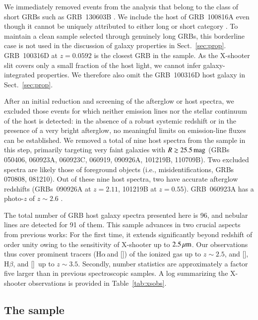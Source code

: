 \documentclass[traditabstract, longauth]{aa}
\newcommand{\hb}{H$\beta$}
\newcommand{\ha}{H$\alpha$}
\newcommand{\oii}{[\ion{O}{ii}]}
\newcommand{\oiii}{[\ion{O}{iii}]}
\newcommand{\nii}{[\ion{N}{ii}]}
\begin{document}
We immediately removed events from the analysis that belong to the class of short GRBs such as GRB~130603B \citep[e.g.,][]{2014A&A...563A..62D}. We include the host of GRB~100816A even though it cannot be uniquely attributed to either long or short category \citep{2010GCNR..300....1O}. To maintain a clean sample selected through genuinely long GRBs, this borderline case is not used in the discussion of galaxy properties in Sect.~\ref{sec:prop}. GRB~100316D at $z=0.0592$ \citep[e.g.,][]{2011MNRAS.411.2792S, 2012ApJ...753...67B} is the closest GRB in the sample. As the X-shooter slit covers only a small fraction of the host light, we cannot infer galaxy-integrated properties. We therefore also omit the GRB~100316D host galaxy in Sect.~\ref{sec:prop}.

After an initial reduction and screening of the afterglow or host spectra, we excluded those events for which neither emission lines nor the stellar continuum of the host is detected: in the absence of a robust systemic redshift or in the presence of a very bright afterglow, no meaningful limits on emission-line fluxes can be established.  {We removed a total of nine host spectra from the sample in this step, primarily targeting very faint galaxies with $R\gtrsim25.5\,\rm{mag}$ (GRBs 050406, 060923A, 060923C, 060919, 090926A, 101219B, 110709B). Two excluded spectra are likely those of foreground objects (i.e., misidentifications, GRBs 070808, 081210). Out of these nine host spectra, two have accurate afterglow redshifts (GRBs~090926A at $z=2.11$, 101219B at $z=0.55$). GRB~060923A has a photo-$z$ of $z\sim2.6$ \citep{2008MNRAS.388.1743T, 2013ApJ...778..128P}.}

The total number of GRB host galaxy spectra presented here is 96, and nebular lines are detected for 91 of them. This sample advances in two crucial aspects from previous works: For the first time, it extends significantly beyond redshift of order unity owing to the sensitivity of X-shooter up to $2.5\,\rm{\mu m}$. Our observations thus cover prominent tracers (\ha\,and \nii) of the ionized gas up to $z\sim2.5$, and \oii, \hb, and \oiii\, up to $z\sim3.5$. Secondly, number statistics are approximately a factor five larger than in previous spectroscopic samples. A log summarizing the X-shooter observations is provided in Table~\ref{tab:xsobs}.

\subsection{The sample}
\end{document}
